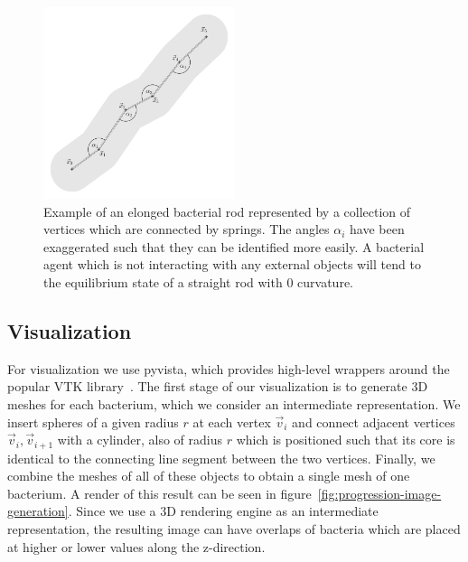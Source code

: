 \documentclass{article}
\begin{document}

\begin{figure}[H]
    \centering
    \includegraphics[width=0.5\textwidth]{docs/source/_static/mechanics.png}
    \caption{
        Example of an elonged bacterial rod represented by a collection of vertices which are
        connected by springs.
        The angles $\alpha_i$ have been exaggerated such that they can be identified more easily.
        A bacterial agent which is not interacting with any external objects will tend to the
        equilibrium state of a straight rod with $0$ curvature.
    }
    \label{fig:mechanics-bacterium}
\end{figure}

\subsection{Visualization}
\label{section:generating-masks-and-images}

For visualization we use pyvista, which provides high-level wrappers around the popular VTK
library~\cite{vtkBook,Sullivan2019}.
The first stage of our visualization is to generate 3D meshes for each bacterium, which we consider
an intermediate representation.
We insert spheres of a given radius $r$ at each vertex $\vec{v}_i$ and connect adjacent vertices
$\vec{v}_i,\vec{v}_{i+1}$ with a cylinder, also of radius $r$ which is positioned such that its core
is identical to the connecting line segment between the two vertices.
Finally, we combine the meshes of all of these objects to obtain a single mesh of one bacterium.
A render of this result can be seen in figure~\ref{fig:progression-image-generation}.
Since we use a 3D rendering engine as an intermediate representation, the resulting image can have
overlaps of bacteria which are placed at higher or lower values along the z-direction.
\end{document}
